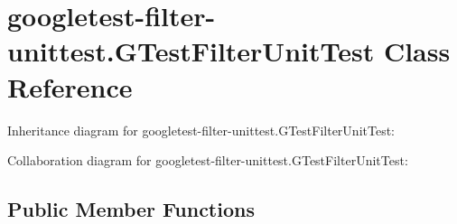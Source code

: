 \hypertarget{classgoogletest-filter-unittest_1_1GTestFilterUnitTest}{}\section{googletest-\/filter-\/unittest.G\+Test\+Filter\+Unit\+Test Class Reference}
\label{classgoogletest-filter-unittest_1_1GTestFilterUnitTest}


Inheritance diagram for googletest-\/filter-\/unittest.G\+Test\+Filter\+Unit\+Test\+:


Collaboration diagram for googletest-\/filter-\/unittest.G\+Test\+Filter\+Unit\+Test\+:
\subsection*{Public Member Functions}
